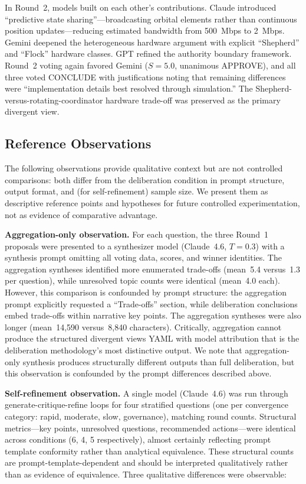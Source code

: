 \documentclass[11pt,a4paper]{article}
\begin{document}
In Round~2, models built on each other's contributions. Claude introduced ``predictive state sharing''---broadcasting orbital elements rather than continuous position updates---reducing estimated bandwidth from 500~Mbps to 2~Mbps. Gemini deepened the heterogeneous hardware argument with explicit ``Shepherd'' and ``Flock'' hardware classes. GPT refined the authority boundary framework. Round~2 voting again favored Gemini ($S = 5.0$, unanimous APPROVE), and all three voted CONCLUDE with justifications noting that remaining differences were ``implementation details best resolved through simulation.'' The Shepherd-versus-rotating-coordinator hardware trade-off was preserved as the primary divergent view.

\subsection{Reference Observations}
\label{sec:baselines}

The following observations provide qualitative context but are not controlled comparisons: both differ from the deliberation condition in prompt structure, output format, and (for self-refinement) sample size. We present them as descriptive reference points and hypotheses for future controlled experimentation, not as evidence of comparative advantage.

\textbf{Aggregation-only observation.} For each question, the three Round~1 proposals were presented to a synthesizer model (Claude~4.6, $T = 0.3$) with a synthesis prompt omitting all voting data, scores, and winner identities. The aggregation syntheses identified more enumerated trade-offs (mean~5.4 versus~1.3 per question), while unresolved topic counts were identical (mean~4.0 each). However, this comparison is confounded by prompt structure: the aggregation prompt explicitly requested a ``Trade-offs'' section, while deliberation conclusions embed trade-offs within narrative key points. The aggregation syntheses were also longer (mean~14{,}590 versus~8{,}840 characters). Critically, aggregation cannot produce the structured divergent views YAML with model attribution that is the deliberation methodology's most distinctive output. We note that aggregation-only synthesis produces structurally different outputs than full deliberation, but this observation is confounded by the prompt differences described above.

\textbf{Self-refinement observation.} A single model (Claude~4.6) was run through generate-critique-refine loops for four stratified questions (one per convergence category: rapid, moderate, slow, governance), matching round counts. Structural metrics---key points, unresolved questions, recommended actions---were identical across conditions (6, 4, 5 respectively), almost certainly reflecting prompt template conformity rather than analytical equivalence. These structural counts are prompt-template-dependent and should be interpreted qualitatively rather than as evidence of equivalence. Three qualitative differences were observable:
\end{document}

